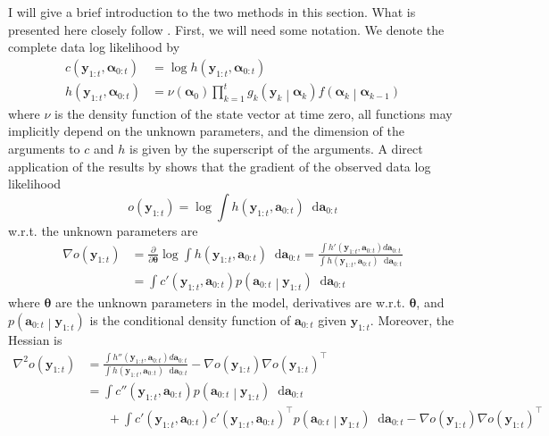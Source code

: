 \documentclass[notitlepage]{article}
\renewcommand{\vec}[1]{\bm{#1}}
\newcommand{\Lparen}[1]{\left( #1\right)}
\newcommand{\Cond}[2]{ #1 \middle\vert  #2}
\newcommand*\diff{\mathop{}\!\mathrm{d}}
\newcommand{\optor}[2]{#1\Lparen{#2}}
\newcommand{\optorC}[3]{\optor{#1}{\Cond{#2}{#3}}}
\begin{document}
I will give a brief introduction to the two methods in this section. What is presented here closely follow 
\cite{poyiadjis11}. First, we will need some notation. We denote the complete data
log likelihood by %
%
\begin{align*}
c\Lparen{\vec y_{1:t}, \vec\alpha_{0:t}} &= \log h\Lparen{\vec y_{1:t}, \vec\alpha_{0:t}} \\
%
h\Lparen{\vec y_{1:t}, \vec\alpha_{0:t}} &= 
	\nu\Lparen{\vec\alpha_0}\prod_{k = 1}^t 
	\optorC{g_k}{\vec y_k}{\vec\alpha_k}
	\optorC{f}{\vec\alpha_k}{\vec\alpha_{k - 1}}
\end{align*}%
% 
where $\nu$ is the density function of the state vector at time zero, 
all functions may implicitly depend on the unknown parameters, 
and the dimension of the arguments to $c$ and $h$ is given 
by the superscript of the arguments. A direct application of the results by \cite{louis82}
shows that the gradient of the observed data log likelihood %
%
$$o\Lparen{\vec y_{1:t}} = 
	\log \int h\Lparen{\vec y_{1:t}, \vec a_{0:t}}\diff\vec a_{0:t}$$
%
w.r.t. the unknown parameters are %
%
\begin{align}
\nabla o\Lparen{\vec y_{1:t}}
&= \frac{\partial}{\partial\vec\theta} \log \int h\Lparen{\vec y_{1:t}, \vec a_{0:t}} 
		\diff\vec a_{0:t}
%
= \frac{\int h'\Lparen{\vec y_{1:t}, \vec a_{0:t}}d\vec a_{0:t}
	}{
	\int h\Lparen{\vec y_{1:t}, \vec a_{0:t}}\diff\vec a_{0:t}}\label{eqn:ONscore}\\
%
&= \int c'\Lparen{\vec y_{1:t}, \vec a_{0:t}}\optorC{p}{\vec a_{0:t}}{\vec y_{1:t}}
	\diff\vec a_{0:t}\nonumber
\end{align}%
% 
where $\vec\theta$ are the unknown parameters in the model, 
derivatives are w.r.t. $\vec\theta$, and 
$\optorC{p}{\vec a_{0:t}}{\vec y_{1:t}}$ is the conditional density function of 
$\vec a_{0:t}$ given $\vec y_{1:t}$. Moreover, the Hessian is%
%
\begin{align}
\nabla^2 o\Lparen{\vec y_{1:t}}
&= \frac{\int h''\Lparen{\vec y_{1:t}, \vec a_{0:t}}d\vec a_{0:t}}{
	\int h\Lparen{\vec y_{1:t}, \vec a_{0:t}}\diff\vec a_{0:t}} - 
	 \nabla o\Lparen{\vec y_{1:t}}
	 \nabla o\Lparen{\vec y_{1:t}}^\top \nonumber\\
%
&= \int c''\Lparen{\vec y_{1:t}, \vec a_{0:t}}\optorC{p}{\vec a_{0:t}}{\vec y_{1:t}}
	\diff\vec a_{0:t} \label{eqn:ONsqHess}\\
&\hspace{20pt}+\int c'\Lparen{\vec y_{1:t}, \vec a_{0:t}}
    c'\Lparen{\vec y_{1:t}, \vec a_{0:t}}^\top
	\optorC{p}{\vec a_{0:t}}{\vec y_{1:t}}\diff\vec a_{0:t} 
	- \nabla o\Lparen{\vec y_{1:t}}
	  \nabla o\Lparen{\vec y_{1:t}}^\top \nonumber
\end{align}
\end{document}
